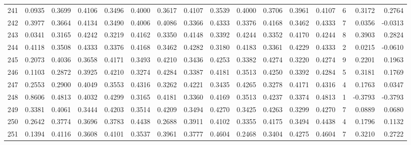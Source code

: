 \begin{tabular}{lrrrrrrrrrrrrrrr}
241 &      0.0935 &  0.3699 &  0.4106 &  0.3496 &  0.4000 &  0.3617 &  0.4107 &  0.3539 &  0.4000 &  0.3706 &   0.3961 &     0.4107 &      6 &                    0.3172 &                     0.2764 \\
242 &      0.3977 &  0.3664 &  0.4134 &  0.3490 &  0.4006 &  0.4086 &  0.3366 &  0.4333 &  0.3376 &  0.4168 &   0.3462 &     0.4333 &      7 &                    0.0356 &                    -0.0313 \\
243 &      0.0341 &  0.3165 &  0.4242 &  0.3219 &  0.4162 &  0.3350 &  0.4148 &  0.3392 &  0.4244 &  0.3352 &   0.4170 &     0.4244 &      8 &                    0.3903 &                     0.2824 \\
244 &      0.4118 &  0.3508 &  0.4333 &  0.3376 &  0.4168 &  0.3462 &  0.4282 &  0.3180 &  0.4183 &  0.3361 &   0.4229 &     0.4333 &      2 &                    0.0215 &                    -0.0610 \\
245 &      0.2073 &  0.4036 &  0.3658 &  0.4171 &  0.3493 &  0.4210 &  0.3436 &  0.4253 &  0.3382 &  0.4274 &   0.3220 &     0.4274 &      9 &                    0.2201 &                     0.1963 \\
246 &      0.1103 &  0.2872 &  0.3925 &  0.4210 &  0.3274 &  0.4284 &  0.3387 &  0.4181 &  0.3513 &  0.4250 &   0.3392 &     0.4284 &      5 &                    0.3181 &                     0.1769 \\
247 &      0.2553 &  0.2900 &  0.4049 &  0.3553 &  0.4316 &  0.3262 &  0.4221 &  0.3435 &  0.4265 &  0.3278 &   0.4171 &     0.4316 &      4 &                    0.1763 &                     0.0347 \\
248 &      0.8606 &  0.4813 &  0.4032 &  0.4299 &  0.3165 &  0.4181 &  0.3360 &  0.4169 &  0.3513 &  0.4237 &   0.3374 &     0.4813 &      1 &                   -0.3793 &                    -0.3793 \\
249 &      0.3381 &  0.4061 &  0.3444 &  0.4203 &  0.3514 &  0.4209 &  0.3494 &  0.4270 &  0.3425 &  0.4263 &   0.3299 &     0.4270 &      7 &                    0.0889 &                     0.0680 \\
250 &      0.2642 &  0.3774 &  0.3696 &  0.3783 &  0.4438 &  0.2688 &  0.3911 &  0.4102 &  0.3355 &  0.4175 &   0.3494 &     0.4438 &      4 &                    0.1796 &                     0.1132 \\
251 &      0.1394 &  0.4116 &  0.3608 &  0.4101 &  0.3537 &  0.3961 &  0.3777 &  0.4604 &  0.2468 &  0.3404 &   0.4275 &     0.4604 &      7 &                    0.3210 &                     0.2722 \\

\end{tabular}
